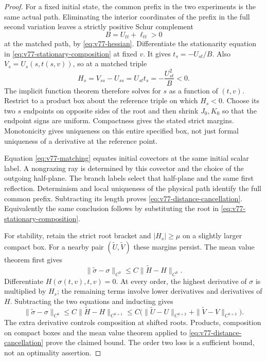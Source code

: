 \begin{proof}
For a fixed initial state, the common prefix in the two experiments is
the same actual path.  Eliminating the interior coordinates of the
prefix in the full second variation leaves a strictly positive Schur
complement
\[
 B=U_{tt}+\ell_{tt}>0
\]
at the matched path, by \eqref{eq:v77-hessian}.  Differentiate the
stationarity equation in \eqref{eq:v77-stationary-composition} at fixed
$v$.  It gives $t_s=-U_{st}/B$.  Also $V_s=U_s(s,t(s,v))$, so at a
matched triple
\begin{equation}\label{eq:v77-matching-derivative}
 H_s=V_{ss}-U_{ss}=U_{st}t_s=-\frac{U_{st}^2}{B}<0.
\end{equation}
The implicit function theorem therefore solves for $s$ as a function
of $(t,v)$.  Restrict to a product box about the reference triple on
which $H_s<0$.  Choose its two $s$ endpoints on opposite sides of the
root and then shrink $J_0,K_0$ so that the endpoint signs are uniform.
Compactness gives the stated strict margins.  Monotonicity gives
uniqueness on this entire specified box, not just formal uniqueness of
a derivative at the reference point.

Equation \eqref{eq:v77-matching} equates initial covectors at the same
initial scalar label.  A nongrazing ray is determined by this covector
and the choice of the outgoing half-plane.  The branch labels select
that half-plane and the same first reflection.  Determinism and local
uniqueness of the physical path identify the full common prefix.
Subtracting its length proves \eqref{eq:v77-distance-cancellation}.
Equivalently the same conclusion follows by substituting the root in
\eqref{eq:v77-stationary-composition}.

For stability, retain the strict root bracket and $|H_s|\ge\mu$ on a
slightly larger compact box.  For a nearby pair $(\widetilde U,
\widetilde V)$ these margins persist.  The mean value theorem first
gives
\[
 \|\widetilde\sigma-\sigma\|_{C^0}
 \le C\|\widetilde H-H\|_{C^0}.
\]
Differentiate $H(\sigma(t,v),t,v)=0$.  At every order, the highest
derivative of $\sigma$ is multiplied by $H_s$; the remaining terms
involve lower derivatives and derivatives of $H$.  Subtracting the two
equations and inducting gives
\[
 \|\widetilde\sigma-\sigma\|_{C^k}
 \le C\|\widetilde H-H\|_{C^{k+1}}
 \le C\bigl(\|\widetilde U-U\|_{C^{k+2}}
             +\|\widetilde V-V\|_{C^{k+2}}\bigr).
\]
The extra derivative controls composition at shifted roots.  Products,
composition on compact boxes and the mean value theorem applied to
\eqref{eq:v77-distance-cancellation} prove the claimed bound.  The
order two loss is a sufficient bound, not an optimality assertion.
\end{proof}

